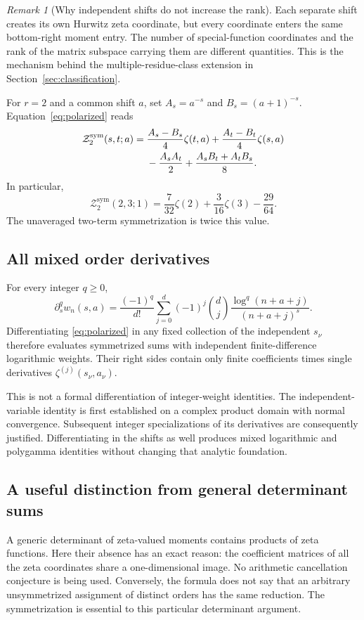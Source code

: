 \documentclass[11pt,letterpaper]{article}
\numberwithin{equation}{section}
\theoremstyle{definition}\newtheorem{definition}[theorem]{Definition}
\theoremstyle{remark}\newtheorem{remark}[theorem]{Remark}
\newcommand{\Z}{\mathcal Z}\newcommand{\Bell}{\mathcal B}
\newcommand{\sym}{\mathrm{sym}}
\begin{document}
\begin{remark}[Why independent shifts do not increase the rank]
Each separate shift creates its own Hurwitz zeta coordinate, but every
coordinate enters the same bottom-right moment entry. The number of
special-function coordinates and the rank of the matrix subspace carrying
them are different quantities. This is the mechanism behind the
multiple-residue-class extension in Section~\ref{sec:classification}.
\end{remark}

For $r=2$ and a common shift $a$, set
$A_s=a^{-s}$ and $B_s=(a+1)^{-s}$. Equation~\eqref{eq:polarized} reads
\begin{align}
 \Z_2^{\sym}(s,t;a)
 ={}&\frac{A_s-B_s}{4}\zeta(t,a)
     +\frac{A_t-B_t}{4}\zeta(s,a)\notag\\
 &-\frac{A_sA_t}{2}
     +\frac{A_sB_t+A_tB_s}{8}.
 \label{eq:polarized-r2}
\end{align}
In particular,
\begin{equation}\label{eq:mixed23}
 \Z_2^{\sym}(2,3;1)
   =\frac7{32}\zeta(2)+\frac3{16}\zeta(3)-\frac{29}{64}.
\end{equation}
The unaveraged two-term symmetrization is twice this value.

\subsection{All mixed order derivatives}
For every integer $q\ge0$,
\begin{equation}\label{eq:order-weight}
 \partial_s^q w_n(s,a)
 =\frac{(-1)^q}{d!}\sum_{j=0}^d(-1)^j\binom dj
       \frac{\log^q(n+a+j)}{(n+a+j)^s}.
\end{equation}
Differentiating \eqref{eq:polarized} in any fixed collection of the
independent $s_\nu$ therefore evaluates symmetrized sums with independent
finite-difference logarithmic weights. Their right sides contain only
finite coefficients times single derivatives
$\zeta^{(j)}(s_\nu,a_\nu)$.

This is not a formal differentiation of integer-weight identities.
The independent-variable identity is first established on a complex
product domain with normal convergence. Subsequent integer specializations
of its derivatives are consequently justified. Differentiating in the
shifts as well produces mixed logarithmic and polygamma identities
without changing that analytic foundation.

\subsection{A useful distinction from general determinant sums}
A generic determinant of zeta-valued moments contains products of zeta
functions. Here their absence has an exact reason: the coefficient
matrices of all the zeta coordinates share a one-dimensional image.
No arithmetic cancellation conjecture is being used. Conversely, the
formula does not say that an arbitrary unsymmetrized assignment of distinct
orders has the same reduction. The symmetrization is essential to this
particular determinant argument.
\end{document}
